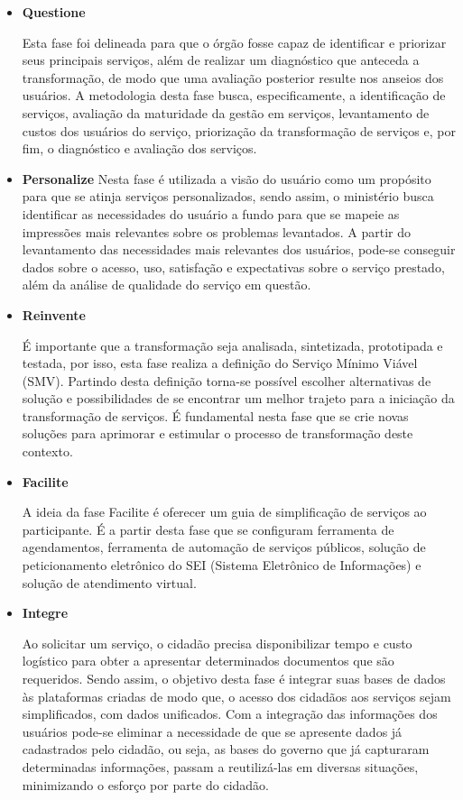 \begin{itemize}
\item \textbf{Questione}

Esta fase foi delineada para que o órgão fosse capaz de identificar e priorizar seus principais serviços, além de realizar um diagnóstico que anteceda a transformação, de modo que uma avaliação posterior resulte nos anseios dos usuários. A metodologia desta fase busca, especificamente, a identificação de serviços, avaliação da maturidade da gestão em serviços, levantamento de custos dos usuários do serviço, priorização da transformação de serviços e, por fim, o diagnóstico e avaliação dos serviços.

\item \textbf{Personalize}
Nesta fase é utilizada a visão do usuário como um propósito para que se atinja serviços personalizados, sendo assim, o ministério busca identificar as necessidades do usuário a fundo para que se mapeie as impressões mais relevantes sobre os problemas levantados. A partir do levantamento das necessidades mais relevantes dos usuários, pode-se conseguir dados sobre o acesso, uso, satisfação e expectativas sobre o serviço prestado, além da análise de qualidade do serviço em questão.


\item \textbf{Reinvente}


É importante que a transformação seja analisada, sintetizada, prototipada e testada, por isso, esta fase realiza a definição do Serviço Mínimo Viável (SMV). Partindo desta definição torna-se possível escolher alternativas de solução e possibilidades de se encontrar um melhor trajeto para a iniciação da transformação de serviços. É fundamental nesta fase que se crie novas soluções para aprimorar e estimular o processo de transformação deste contexto.


\item \textbf{Facilite}


A ideia da fase Facilite é oferecer um guia de simplificação de serviços ao participante. É a partir desta fase que se configuram ferramenta de agendamentos, ferramenta de automação de serviços públicos, solução de peticionamento eletrônico do SEI (Sistema Eletrônico de Informações) e solução de atendimento virtual.



\item \textbf{Integre}


Ao solicitar um serviço, o cidadão precisa disponibilizar tempo e custo logístico para obter a apresentar determinados documentos que são requeridos. Sendo assim, o objetivo desta fase é integrar suas bases de dados às plataformas criadas de modo que, o acesso dos cidadãos aos serviços sejam simplificados, com dados unificados. Com a integração das informações dos usuários pode-se eliminar a necessidade de que se apresente dados já cadastrados pelo cidadão, ou seja, as bases do governo que já capturaram determinadas informações, passam a reutilizá-las em diversas situações, minimizando o esforço por parte do cidadão.



\end{itemize}

